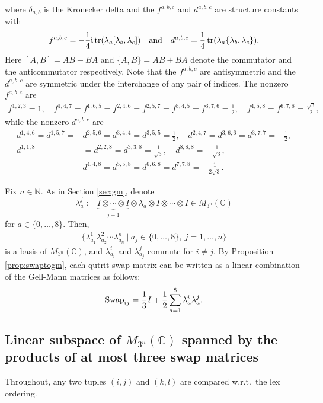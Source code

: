 \documentclass[12pt,dvipsnames,accepted=2016-08-18,a4paper,onecolumn]{quantumarticle}
\numberwithin{equation}{section}
\newcommand{\NN}{\mathbb N}
\newcommand{\CC}{\mathbb C}
\theoremstyle{definition}
\begin{document}
where $\delta_{a,b}$ is the Kronecker delta and the $f^{a,b,c}$ and $d^{a,b,c}$ are structure constants with
$$
f^{a,b,c} = -\frac{1}{4} \mathfrak{i}\, \text{\textnormal{tr}}(\lambda_a[\lambda_b,\lambda_c]) \quad \text{and} \quad
d^{a,b,c} = \frac{1}{4}\, \text{\textnormal{tr}}(\lambda_a\{\lambda_b,\lambda_c\}).
$$
Here $[A,B]=AB-BA$ and $\{A,B\} = AB+BA$ denote the commutator and the anticommutator respectively. Note that the $f^{a,b,c}$ are antisymmetric and the $d^{a,b,c}$ are symmetric under the interchange of any pair of indices. 
The nonzero $f^{a,b,c}$ are
\begin{align*}
	f^{1,2,3}=1, \quad f^{1,4,7} = f^{1,6,5} = f^{2,4,6} = f^{2,5,7} = f^{3,4,5} = f^{3,7,6} = \frac{1}{2}, \quad
	 f^{4,5,8} = f^{6,7,8} = \frac{\sqrt{3}}{2},
\end{align*}
while the nonzero $d^{a,b,c}$ are
\begin{align*}
	d^{1,4,6} = d^{1,5,7} = &d^{2,5,6} = d^{3,4,4} = d^{3,5,5}  = \frac{1}{2}, \quad
	d^{2,4,7} = d^{3,6,6} = d^{3,7,7} = -\frac{1}{2},\\
	d^{1,1,8}& = d^{2,2,8} = d^{3,3,8} = \frac{1}{\sqrt{3}}, \quad
	 d^{8,8,8} = -\frac{1}{\sqrt{3}}, \\
	 &d^{4,4,8} = d^{5,5,8} = d^{6,6,8} = d^{7,7,8} = -\frac{1}{2 \sqrt{3}}.
\end{align*}



Fix $n \in \NN$. As in Section \ref{sec:gm}, denote
$$
\lambda_a^{j} := \underbrace{I \otimes \cdots \otimes I}_{j-1} \otimes \lambda_a \otimes I \otimes \cdots \otimes I \in M_{3^n}(\CC)
$$
for $a \in \{0,\ldots,8\}$. 
Then, 
\begin{align}\label{eq: basis-gm}
\{\lambda_{a_1}^1 \lambda_{a_2}^2 \cdots \lambda_{a_n}^n \ | \ a_j \in \{0,\ldots,8\},\  j=1,\ldots,n\}
\end{align}
is a basis of $M_{3^n}(\CC)$, and $\lambda_{a_i}^i$ and $\lambda_{a_j}^j$ commute for $i \neq j.$
By Proposition \ref{prop:swaptogm}, each qutrit swap matrix can be written as a linear combination of the Gell-Mann matrices as follows:
\begin{align}\label{eq: sw-gm}
\text{\textnormal{Swap}}_{ij}= \frac{1}{3} I + \frac{1}{2} \sum_{a=1}^8 \lambda_a^i \lambda_a^j.
\end{align}





\subsection{Linear subspace of  $M_{3^n}(\CC)$ spanned by the products of at most three swap matrices}\label{a:d3l3}
Throughout, any two tuples $(i,j)$ and $(k,l)$ are compared w.r.t.~the lex ordering.
\end{document}

